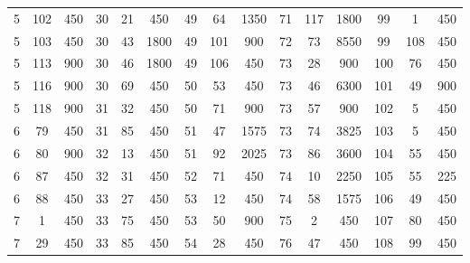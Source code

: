 \begin{center}
\begin{tabular}{|c|c|c||c|c|c||c|c|c||c|c|c||c|c|c|}
        5          & 102        & 450        & 30         & 21         & 450        & 49         & 64         & 1350       & 71         & 117        & 1800       & 99         & 1          & 450        \\
        5          & 103        & 450        & 30         & 43         & 1800       & 49         & 101        & 900        & 72         & 73         & 8550       & 99         & 108        & 450        \\
        5          & 113        & 900        & 30         & 46         & 1800       & 49         & 106        & 450        & 73         & 28         & 900        & 100        & 76         & 450        \\
        5          & 116        & 900        & 30         & 69         & 450        & 50         & 53         & 450        & 73         & 46         & 6300       & 101        & 49         & 900        \\
        5          & 118        & 900        & 31         & 32         & 450        & 50         & 71         & 900        & 73         & 57         & 900        & 102        & 5          & 450        \\
        6          & 79         & 450        & 31         & 85         & 450        & 51         & 47         & 1575       & 73         & 74         & 3825       & 103        & 5          & 450        \\
        6          & 80         & 900        & 32         & 13         & 450        & 51         & 92         & 2025       & 73         & 86         & 3600       & 104        & 55         & 450        \\
        6          & 87         & 450        & 32         & 31         & 450        & 52         & 71         & 450        & 74         & 10         & 2250       & 105        & 55         & 225        \\
        6          & 88         & 450        & 33         & 27         & 450        & 53         & 12         & 450        & 74         & 58         & 1575       & 106        & 49         & 450        \\
        7          & 1          & 450        & 33         & 75         & 450        & 53         & 50         & 900        & 75         & 2          & 450        & 107        & 80         & 450        \\
        7          & 29         & 450        & 33         & 85         & 450        & 54         & 28         & 450        & 76         & 47         & 450        & 108        & 99         & 450        \\

\end{tabular}
\end{center}

